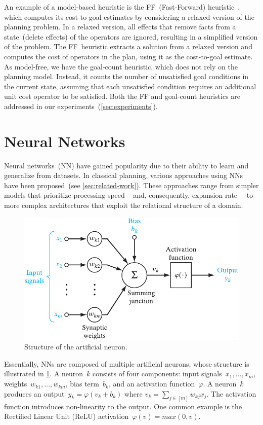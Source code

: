 An example of a model-based heuristic is the FF~(Fast-Forward) heuristic~\cite{hoffmann2001ff}, which computes its cost-to-goal estimates by considering a relaxed version of the planning problem. In a relaxed version, all effects that remove facts from a state~(delete effects) of the operators are ignored, resulting in a simplified version of the problem. The FF~heuristic extracts a solution from a relaxed version and computes the cost of operators in the plan, using it as the cost-to-goal estimate. As model-free, we have the goal-count heuristic, which does not rely on the planning model. Instead, it counts the number of unsatisfied goal conditions in the current state, assuming that each unsatisfied condition requires an additional unit cost operator to be satisfied. Both the FF and goal-count heuristics are addressed in our experiments~(\cref{sec:experiments}).

\section{Neural Networks}
\label{sec:neural-networks}

Neural networks~(NN) have gained popularity due to their ability to learn and generalize from datasets. In classical planning, various approaches using NNs have been proposed~(see \cref{sec:related-work}). These approaches range from simpler models that prioritize processing speed -- and, consequently, expansion rate~-- to more complex architectures that exploit the relational structure of a domain.

\begin{figure}[ht]
    \caption{Structure of the artificial neuron.}
    \label{fig:neuron}
    \addmargin
    \centering
    \includegraphics[width=0.8\linewidth]{figures/neuron.pdf}
    \addmargin
\end{figure}

Essentially, NNs are composed of multiple artificial neurons, whose structure is illustrated in \cref{fig:neuron}. A neuron~$k$ consists of four components: input signals~$x_1,\ldots,x_m$, weights~$w_{k1},\ldots,w_{km}$, bias term~$b_k$, and an activation function~$\varphi$. A neuron~$k$ produces an output~$y_k = \varphi(v_k + b_k)$ where $v_k = \sum_{j \in [m]} w_{kj} x_j$. The activation function introduces non-linearity to the output. One common example is the Rectified Linear Unit (ReLU) activation~$\varphi(v) = max(0,v)$.

